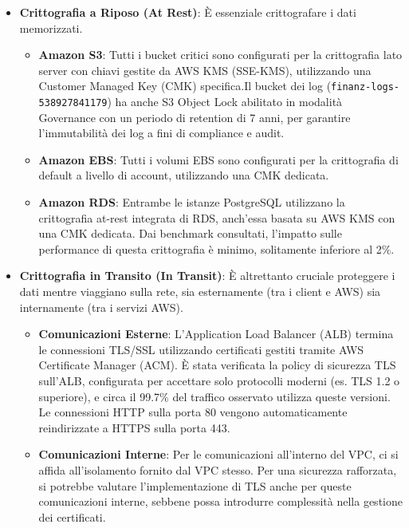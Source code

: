 \begin{itemize}
    \item \textbf{Crittografia a Riposo (At Rest)}: È essenziale crittografare i dati memorizzati.
    \begin{itemize}
        \item \textbf{Amazon S3}: Tutti i bucket critici sono configurati per la crittografia lato server con chiavi gestite da AWS KMS (SSE-KMS), utilizzando una Customer Managed Key (CMK) specifica.Il bucket dei log (\texttt{finanz-logs-538927841179}) ha anche S3 Object Lock abilitato in modalità Governance con un periodo di retention di 7 anni, per garantire l'immutabilità dei log a fini di compliance e audit.
        \item \textbf{Amazon EBS}: Tutti i volumi EBS sono configurati per la crittografia di default a livello di account, utilizzando una CMK dedicata.
        \item \textbf{Amazon RDS}: Entrambe le istanze PostgreSQL utilizzano la crittografia at-rest integrata di RDS, anch'essa basata su AWS KMS con una CMK dedicata. Dai benchmark consultati, l'impatto sulle performance di questa crittografia è minimo, solitamente inferiore al 2\%.
    \end{itemize}
    \item \textbf{Crittografia in Transito (In Transit)}: È altrettanto cruciale proteggere i dati mentre viaggiano sulla rete, sia esternamente (tra i client e AWS) sia internamente (tra i servizi AWS).
    \begin{itemize}
        \item \textbf{Comunicazioni Esterne}: L'Application Load Balancer (ALB) termina le connessioni TLS/SSL utilizzando certificati gestiti tramite AWS Certificate Manager (ACM). È stata verificata la policy di sicurezza TLS sull'ALB, configurata per accettare solo protocolli moderni (es. TLS 1.2 o superiore), e circa il 99.7\% del traffico osservato utilizza queste versioni. Le connessioni HTTP sulla porta 80 vengono automaticamente reindirizzate a HTTPS sulla porta 443.
        \item \textbf{Comunicazioni Interne}: Per le comunicazioni all'interno del VPC, ci si affida all'isolamento fornito dal VPC stesso. Per una sicurezza rafforzata, si potrebbe valutare l'implementazione di TLS anche per queste comunicazioni interne, sebbene possa introdurre complessità nella gestione dei certificati.
    \end{itemize}
\end{itemize}

